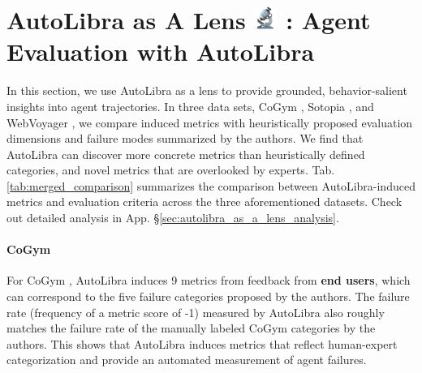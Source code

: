 \documentclass[../main.tex]{subfiles}
\begin{document}
\section{\texorpdfstring{AutoLibra as A Lens
\includegraphics[height=1em]{figs/microscope.png}
: Agent Evaluation with AutoLibra}{AutoLibra as a lens: agent evaluation with AutoLibra}}
\label{sec:lens}

In this section, we use AutoLibra as a lens to provide grounded, behavior-salient
insights into agent trajectories. In three data sets, CoGym \citep{shao2024collaborative},
Sotopia \citep{zhousotopia}, and WebVoyager \citep{he2024webvoyager}, we compare
induced metrics with heuristically proposed evaluation dimensions and failure modes
summarized by the authors. We find that AutoLibra can discover more concrete
metrics than heuristically defined categories, and novel metrics that are overlooked
by experts. Tab. \ref{tab:merged_comparison} summarizes the comparison between AutoLibra-induced
metrics and evaluation criteria across the three aforementioned datasets. Check out detailed analysis in App. \S\ref{sec:autolibra_as_a_lens_analysis}.

\paragraph{CoGym}
For CoGym \citep{shao2024collaborative}, AutoLibra induces 9 metrics from
feedback from \textbf{end users}, which can correspond to the five failure
categories proposed by the authors. The failure rate (frequency of a metric
score of -1) measured by AutoLibra also roughly matches the failure rate of the
manually labeled CoGym categories by the authors. This shows that AutoLibra induces
metrics that reflect human-expert categorization and provide an automated measurement
of agent failures.
\end{document}

